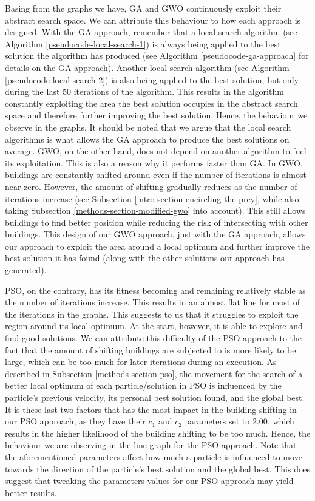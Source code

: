 Basing from the graphs we have, GA and GWO continuously exploit their abstract search space. We can attribute this behaviour to how each approach is designed. With the GA approach, remember that a local search algorithm (see Algorithm \ref{pseudocode-local-search-1}) is always being applied to the best solution the algorithm has produced (see Algorithm \ref{pseudocode-ga-approach} for details on the GA approach). Another local search algorithm (see Algorithm \ref{pseudocode-local-search-2}) is also being applied to the best solution, but only during the last 50 iterations of the algorithm. This results in the algorithm constantly exploiting the area the best solution occupies in the abstract search space and therefore further improving the best solution. Hence, the behaviour we observe in the graphs. It should be noted that we argue that the local search algorithms is what allows the GA approach to produce the best solutions on average. GWO, on the other hand, does not depend on another algorithm to fuel its exploitation. This is also a reason why it performs faster than GA. In GWO, buildings are constantly shifted around even if the number of iterations is almost near zero. However, the amount of shifting gradually reduces as the number of iterations increase (see Subsection \ref{intro-section-encircling-the-prey}, while also taking Subsection \ref{methods-section-modified-gwo} into account). This still allows buildings to find better position while reducing the risk of intersecting with other buildings. This design of our GWO approach, just with the GA approach, allows our approach to exploit the area around a local optimum and further improve the best solution it has found (along with the other solutions our approach has generated).

PSO, on the contrary, has its fitness becoming and remaining relatively stable as the number of iterations increase. This results in an almost flat line for most of the iterations in the graphs. This suggests to us that it struggles to exploit the region around its local optimum. At the start, however, it is able to explore and find good solutions. We can attribute this difficulty of the PSO approach to the fact that the amount of shifting buildings are subjected to is more likely to be large, which can be too much for later iterations during an execution. As described in Subsection \ref{methods-section-pso}, the movement for the search of a better local optimum of each particle/solution in PSO is influenced by the particle's previous velocity, its personal best solution found, and the global best. It is these last two factors that has the most impact in the building shifting in our PSO approach, as they have their $c_{1}$ and $c_{2}$ parameters set to $2.00$, which results in the higher likelihood of the building shifting to be too much. Hence, the behaviour we are observing in the line graph for the PSO approach. Note that the aforementioned parameters affect how much a particle is influenced to move towards the direction of the particle's best solution and the global best. This does suggest that tweaking the parameters values for our PSO approach may yield better results.

